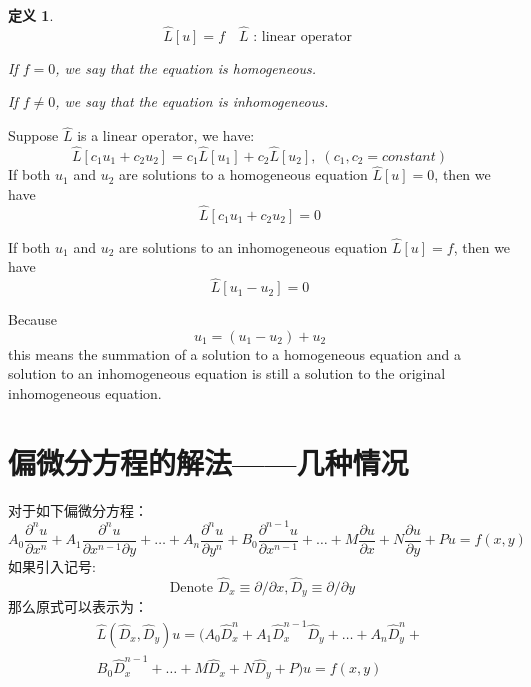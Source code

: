 \documentclass[10pt, a4paper, oneside]{ctexbook}
\newtheorem{definition}[theorem]{定义}
\begin{document}
\begin{definition}
    $$
    \hat{L}[u]=f \quad \hat{L} \text { : linear operator }
    $$
    \rm

    If $f=0$, we say that the equation is {\color{red}homogeneous}. 

    If $f\ne0$, we say that the equation is {\color{red}inhomogeneous}. 
\end{definition}
Suppose $\hat{L}$ is a linear operator, we have:
$$\hat{L}\left[c_{1} u_{1}+c_{2} u_{2}\right]=c_{1} \hat{L}\left[u_{1}\right]+c_{2} \hat{L}\left[u_{2}\right], \; (c_{1}, c_{2}=constant)$$  
If both $u_{1}$ and $u_{2}$ are solutions to a homogeneous equation $\hat{L}[u]=0$, then we have $$\hat{L}\left[c_{1} u_{1}+c_{2} u_{2}\right]=0$$

If both $u_{1}$ and $u_{2}$ are solutions to an inhomogeneous equation $\hat{L}[u]=f$, then we have $$\hat{L}\left[u_{1}-u_{2}\right]=0$$

Because $$u_{1}=\left(u_{1}-u_{2}\right)+u_{2}$$ this means the summation of a solution to a homogeneous equation and a solution to an inhomogeneous equation is still a solution to the original inhomogeneous equation.
\section{偏微分方程的解法——几种情况}
对于如下偏微分方程：
$$
A_{0} \frac{\partial^{n} u}{\partial x^{n}}+A_{1} \frac{\partial^{n} u}{\partial x^{n-1} \partial y}+\ldots+A_{n} \frac{\partial^{n} u}{\partial y^{n}}+B_{0} \frac{\partial^{n-1} u}{\partial x^{n-1}}+\ldots+M \frac{\partial u}{\partial x}+N \frac{\partial u}{\partial y}+P u=f(x, y)
$$
如果引入记号:
$$
\text { Denote } \hat{D}_{x} \equiv \partial / \partial x, \hat{D}_{y} \equiv \partial / \partial y
$$
那么原式可以表示为：
\begin{align*}
    \hat{L}(\hat{D}_{x}, \hat{D}_{y}) u=(A_{0} \hat{D}_{x}^{n}+A_{1} \hat{D}_{x}^{n-1} \hat{D}_{y}+\ldots+A_{n} \hat{D}_{y}^{n}+
    \\ B_{0} \hat{D}_{x}^{n-1}+\ldots+M \hat{D}_{x}+N \hat{D}_{y}+P) u=f(x, y)
\end{align*}
\end{document}

